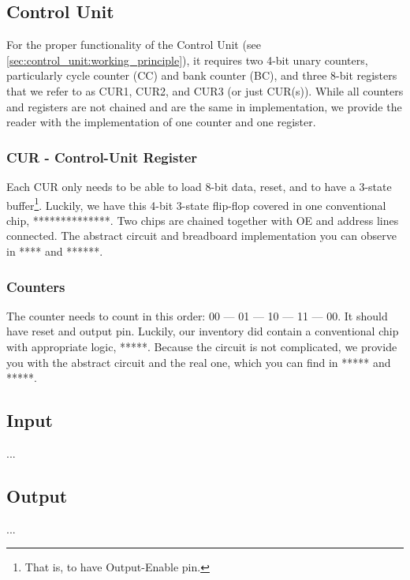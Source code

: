 \subsection{Control Unit} \label{sec:implementation:control_unit}
For the proper functionality of the Control Unit (see \ref{sec:control_unit:working_principle}), it requires two 4-bit unary counters, particularly cycle counter (CC) and bank counter (BC), and three 8-bit registers that we refer to as CUR1, CUR2, and CUR3 (or just CUR(s)). While all counters and registers are not chained and are the same in implementation, we provide the reader with the implementation of one counter and one register.

\subsubsection{CUR - Control-Unit Register} \label{sec:implementation:control_unit:cur}
Each CUR only needs to be able to load 8-bit data, reset, and to have a 3-state buffer\footnote{That is, to have Output-Enable pin.}. Luckily, we have this 4-bit 3-state flip-flop covered in one conventional chip, **************. Two chips are chained together with OE and address lines connected. The abstract circuit and breadboard implementation you can observe in **** and ******.


\subsubsection{Counters} \label{sec:implementation:control_unit:counters}
The counter needs to count in this order: 00 --- 01 --- 10 --- 11 --- 00. It should have reset and output pin. Luckily, our inventory did contain a conventional chip with appropriate logic, *****. Because the circuit is not complicated, we provide you with the abstract circuit and the real one, which you can find in ***** and *****.


\subsection{Input} \label{sec:implementation:input}
...

\subsection{Output} \label{sec:implementation:output}
...
